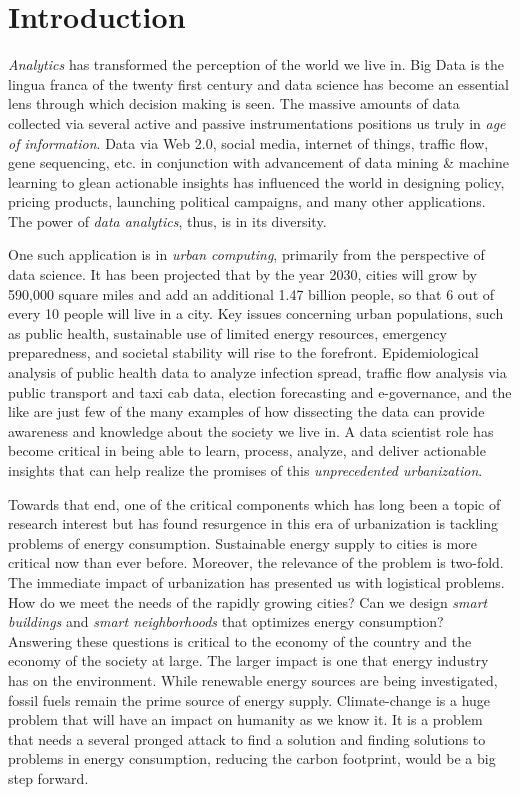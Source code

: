 \chapter{Introduction}

\emph{Analytics} has transformed the perception of the world we live in. Big Data is the lingua franca of the twenty first century and data science has become an essential lens through which decision making is seen. The massive amounts of data collected via several active and passive instrumentations positions us truly in \emph{age of information}. Data via Web 2.0, social media, internet of things, traffic flow, gene sequencing, etc. in conjunction with advancement of data mining & machine learning to glean actionable insights has influenced the world in designing policy, pricing products, launching political campaigns, and many other applications. The power of \emph{data analytics}, thus, is in its diversity. 

One such application is in \emph{urban computing}, primarily from the perspective of data science. It has been projected that by the year 2030, cities will grow by 590,000 square miles and add an additional 1.47 billion people, so that 6 out of every 10 people will live in a city. Key issues concerning urban populations, such as public health, sustainable use of limited energy resources, emergency preparedness, and societal stability will rise to the forefront. Epidemiological analysis of public health data to analyze infection spread, traffic flow analysis via public transport and taxi cab data, election forecasting and e-governance, and the like are just few of the many examples of how dissecting the data can provide awareness and knowledge about the society we live in. A data scientist role has become critical in being able to learn, process, analyze, and deliver actionable insights that can help realize the promises of this \emph{unprecedented urbanization}. 

Towards that end, one of the critical components which has long been a topic of research interest but has found resurgence in this era of urbanization is tackling problems of energy consumption. Sustainable energy supply to cities is more critical now than ever before. Moreover, the relevance of the problem is two-fold. The immediate impact of urbanization has presented us with logistical problems. How do we meet the needs of the rapidly growing cities? Can we design \emph{smart buildings} and \emph{smart neighborhoods} that optimizes energy consumption? Answering these questions is critical to the economy of the country and the economy of the society at large. The larger impact is one that energy industry has on the environment. While renewable energy sources are being investigated, fossil fuels remain the prime source of energy supply. Climate-change is a huge problem that will have an impact on humanity as we know it. It is a problem that needs a several pronged attack to find a solution and finding solutions to problems in energy consumption, reducing the carbon footprint, would be a big step forward.


